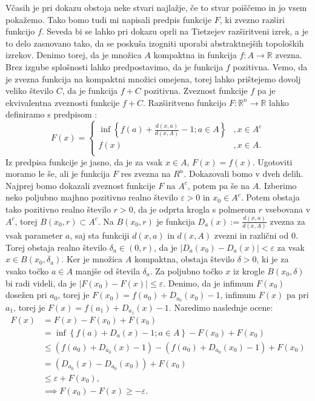 \documentclass[mat1]{fmfdelo}
\newcommand{\R}{\mathbb R}
\newcommand{\0}{\underline{0}}
\begin{document}
\begin{dokaz}
Včasih je pri dokazu obstoja neke stvari najlažje, če to stvar poiščemo in jo vsem pokažemo. Tako bomo tudi mi napisali predpis funkcije $F$, ki zvezno razširi funkcijo $f$. Seveda bi se lahko pri dokazu oprli na Tietzejev razširitveni izrek, a je to delo zasnovano tako, da se poskuša izogniti uporabi abstraktnejših topoloških izrekov. Denimo torej, da je množica $A$ kompaktna in funkcija \mbox{$f : A \to \R$} zvezna. Brez izgube splošnosti lahko predpostavimo, da je funkcija $f$ pozitivna. Vemo, da je zvezna funkcija na kompaktni množici omejena, torej lahko prištejemo dovolj veliko število $C$, da je funkcija $f + C$ pozitivna. Zveznost funkcije $f$ pa je ekvivalentna zveznosti funkcije $f + C$.
Razširitveno funkcijo \mbox{$F : \R^n \to \R$} lahko definiramo s predpisom :
\[  F(x) = \left \{
\begin{array}{ll}
	\inf \left \{ f(a) + \frac{d(x, a)}{d(x, A)} - 1; a \in A \right \} &, x \in A^c \\
	f(x) &, x \in A. \\
\end{array} 
\right. \]
Iz predpisa funkcije je jasno, da je za vsak $x \in A$, $F(x) = f(x)$. Ugotoviti moramo le še, ali je funkcija $F$ res zvezna na $R^n$.
Dokazovali bomo v dveh delih. Najprej bomo dokazali zveznost funkcije $F$ na $A^c$, potem pa še na $A$.
Izberimo neko poljubno majhno pozitivno realno število $\varepsilon > 0$ in $x_0 \in A^c$. Potem obstaja tako pozitivno realno število $r>0$, da je odprta krogla s polmerom $r$ vsebovana v $A^c$, torej $B(x_0, r) \subset A^c$. Na $B(x_0, r)$ je funkcija $D_a(x) := \frac{d(x, a)}{d(x, A)}$ zvezna za vsak parameter $a$, saj sta funkciji $d(x, a)$ in $d(x, A)$ zvezni in različni od $0$. Torej obstaja realno število $\delta_a \in (0, r)$, da je $|D_a(x_0) - D_a(x)| < \varepsilon$ za vsak $x \in B(x_0, \delta_a)$. Ker je množica $A$ kompaktna, obstaja število $\delta > 0$, ki je za vsako točko $a \in A$ manjše od števila $\delta_a$. Za poljubno točko $x$ iz krogle $B(x_0, \delta)$ bi radi videli, da je $|F(x_0) - F(x)| \leq \varepsilon$.
Denimo, da je infimum $F(x_0)$ dosežen pri $a_0$, torej je $F(x_0) = f(a_0) + D_{a_0}(x_0) - 1$, infimum $F(x)$ pa pri $a_1$, torej je $F(x) = f(a_1) + D_{a_1}(x) - 1$. Naredimo naslednje ocene:
\begin{equation*}
\begin{split}
F(x) & = F(x) - F(x_0) + F(x_0) \\
& = \inf \left \{ f(a) + D_a(x) - 1; a \in A \right \} - F(x_0) + F(x_0) \\
& \leq (f(a_0) + D_{a_0}(x) - 1) -  (f(a_0) + D_{a_0}(x_0) - 1) + F(x_0) \\
& = (D_{a_0}(x) -  D_{a_0}(x_0)) + F(x_0) \\
& \leq \varepsilon + F(x_0), \\
& \implies F(x_0) - F(x) \geq -\varepsilon.
\end{split}
\end{equation*}


\end{dokaz}
\end{document}
